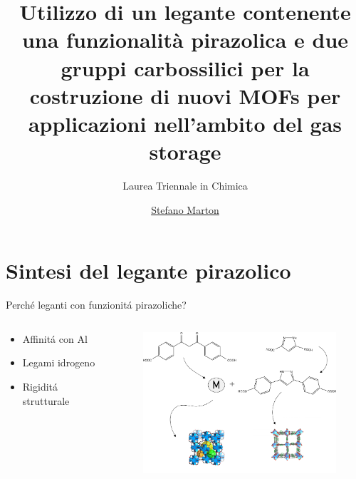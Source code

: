 \documentclass{beamer}
\title{\large{Utilizzo di un legante contenente una funzionalità pirazolica e due gruppi carbossilici per la costruzione di nuovi MOFs per applicazioni nell’ambito del gas storage}}
\subtitle{Laurea Triennale in Chimica}
\author{\href{stefano.marton@studenti.unimi.it}{Stefano Marton}}
\begin{document}
\maketitle

\section{Sintesi del legante pirazolico}

\setlength{\columnsep}{0.2cm}
\begin{frame}{Perché leganti con funzionitá pirazoliche?}
	\begin{columns}
		\hspace{1cm}
		\begin{column}{0.3\textwidth}
			\begin{itemize}
				\item Affinitá con Al
				\item Legami idrogeno
				\item Rigiditá strutturale
			\end{itemize}
		\end{column}
		\hspace{-1cm}
		\begin{column}{0.7\textwidth}
			\begin{figure}[h]
				\includegraphics[width=8cm,keepaspectratio]{illustration/drawing.png}
			\end{figure}
		\end{column}
	\end{columns}
\end{frame}
\end{document}
